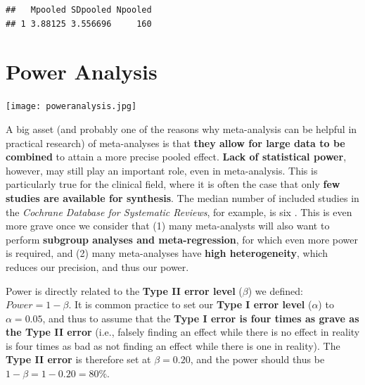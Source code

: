 \documentclass[]{book}
\newenvironment{Shaded}{\begin{snugshade}}{\end{snugshade}}
\newcommand{\DataTypeTok}[1]{\textcolor[rgb]{0.13,0.29,0.53}{#1}}
\newcommand{\DecValTok}[1]{\textcolor[rgb]{0.00,0.00,0.81}{#1}}
\newcommand{\FloatTok}[1]{\textcolor[rgb]{0.00,0.00,0.81}{#1}}
\newcommand{\KeywordTok}[1]{\textcolor[rgb]{0.13,0.29,0.53}{\textbf{#1}}}
\newcommand{\NormalTok}[1]{#1}
\newcommand{\OperatorTok}[1]{\textcolor[rgb]{0.81,0.36,0.00}{\textbf{#1}}}
\begin{document}
\begin{Shaded}
\end{Shaded}

\begin{verbatim}
##   Mpooled SDpooled Npooled
## 1 3.88125 3.556696     160
\end{verbatim}

\hypertarget{power-analysis}{%
\chapter{Power Analysis}\label{power-analysis}}

\texttt{[image: poweranalysis.jpg]}

A big asset (and probably one of the reasons why meta-analysis can be helpful in practical research) of meta-analyses is that \textbf{they allow for large data to be combined} to attain a more precise pooled effect. \textbf{Lack of statistical power}, however, may still play an important role, even in meta-analysis. This is particularly true for the clinical field, where it is often the case that only \textbf{few studies are available for synthesis}. The median number of included studies in the \emph{Cochrane Database for Systematic Reviews}, for example, is six \citep{borenstein2011}. This is even more grave once we consider that (1) many meta-analysts will also want to perform \textbf{subgroup analyses and meta-regression}, for which even more power is required, and (2) many meta-analyses have \textbf{high heterogeneity}, which reduces our precision, and thus our power.

Power is directly related to the \textbf{Type II error level} (\(\beta\)) we defined: \(Power = 1- \beta\). It is common practice to set our \textbf{Type I error level} (\(\alpha\)) to \(\alpha=0.05\), and thus to assume that the \textbf{Type I error is four times as grave as the Type II error} (i.e., falsely finding an effect while there is no effect in reality is four times as bad as not finding an effect while there is one in reality). The \textbf{Type II error} is therefore set at \(\beta=0.20\), and the power should thus be \(1-\beta=1-0.20=80\%\).
\end{document}
